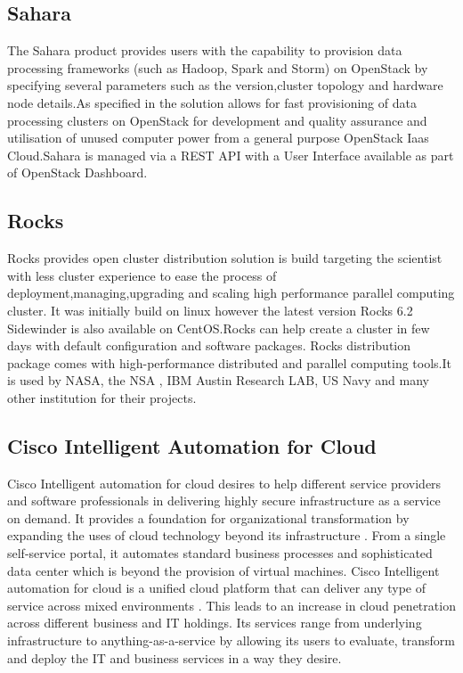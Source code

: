 \subsection{Sahara}

     The Sahara product provides users with the capability to
     provision data processing frameworks (such as Hadoop, Spark and
     Storm) on OpenStack \cite{www-openStack} by specifying several
     parameters such as the version,cluster topology and hardware node
     details.As specified in \cite{www-Sahara} the solution allows
     for fast provisioning of data processing clusters on OpenStack
     for development and quality assurance and utilisation of unused
     computer power from a general purpose OpenStack Iaas Cloud.Sahara
     is managed via a REST API with a User Interface available as part
     of OpenStack Dashboard.

\subsection{Rocks}

     \cite{www-rockscluster} Rocks provides open cluster distribution
     solution is build targeting the scientist with less cluster
     experience to ease the process of deployment,managing,upgrading
     and scaling high performance parallel computing cluster.  It was
     initially build on linux however the latest version Rocks 6.2
     Sidewinder is also available on CentOS.Rocks can help create a
     cluster in few days with default configuration and software
     packages.  Rocks distribution package comes with high-performance
     distributed and parallel computing tools.It is used by NASA, the
     NSA , IBM Austin Research LAB, US Navy and many other institution
     for their projects.

\subsection{Cisco Intelligent Automation for Cloud}

     Cisco Intelligent automation for cloud desires to help different
     service providers and software professionals in delivering highly
     secure infrastructure as a service on demand. It provides a
     foundation for organizational transformation by expanding the
     uses of cloud technology beyond its infrastructure
     \cite{cis1}. From a single self-service portal, it automates
     standard business processes and sophisticated data center which
     is beyond the provision of virtual machines. Cisco Intelligent
     automation for cloud is a unified cloud platform that can deliver
     any type of service across mixed environments \cite{cis2}. This
     leads to an increase in cloud penetration across different
     business and IT holdings. Its services range from underlying
     infrastructure to anything-as-a-service by allowing its users to
     evaluate, transform and deploy the IT and business services in a
     way they desire.


